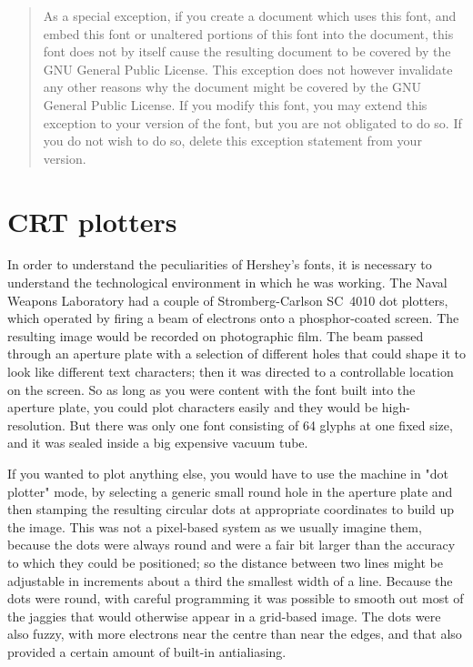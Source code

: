 \documentclass{article}
\begin{document}
\begin{quotation}
As a special exception, if you create a document which uses this font, and
embed this font or unaltered portions of this font into the document, this
font does not by itself cause the resulting document to be covered by the
GNU General Public License. This exception does not however invalidate any
other reasons why the document might be covered by the GNU General Public
License. If you modify this font, you may extend this exception to your
version of the font, but you are not obligated to do so. If you do not wish
to do so, delete this exception statement from your version.
\end{quotation}


\section{CRT plotters}

In order to understand the peculiarities of Hershey's fonts, it is
necessary to understand the technological environment in which he was
working.  The Naval Weapons Laboratory had a couple of Stromberg-Carlson
SC~4010 dot plotters, which operated by firing a beam of electrons onto a
phosphor-coated screen.  The resulting image would be recorded on
photographic film.  The beam passed through an aperture plate with a
selection of different holes that could shape it to look like different text
characters; then it was directed to a controllable location on the screen. 
So as long as you were content with the font built into the aperture plate,
you could plot characters easily and they would be high-resolution.  But
there was only one font consisting of 64 glyphs at one fixed size, and it
was sealed inside a big expensive vacuum tube.

If you wanted to plot anything else, you would have to use the machine in
"dot plotter" mode, by selecting a generic small round hole in the aperture
plate and then stamping the resulting circular dots at appropriate
coordinates to build up the image.  This was not a pixel-based system as we
usually imagine them, because the dots were always round and were a fair bit
larger than the accuracy to which they could be positioned; so the distance
between two lines might be adjustable in increments about a third the
smallest width of a line.  Because the dots were round, with careful
programming it was possible to smooth out most of the jaggies that would
otherwise appear in a grid-based image.  The dots were also fuzzy, with more
electrons near the centre than near the edges, and that also provided a
certain amount of built-in antialiasing.
\end{document}
